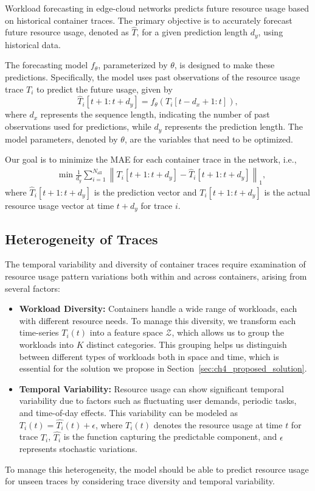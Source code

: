 Workload forecasting in edge-cloud networks predicts future resource usage based on historical container traces. The primary objective is to accurately forecast future resource usage, denoted as $\hat{T}$, for a given prediction length $d_y$, using historical data.

The forecasting model $f_\theta$, parameterized by $\theta$, is designed to make these predictions. Specifically, the model uses past observations of the resource usage trace $T_i$ to predict the future usage, given by
\begin{equation}
    \hat{T}_i[t + 1:t + d_y] = f_\theta\left(T_i[t - d_x + 1:t]\right),
\end{equation}
where $d_x$ represents the sequence length, indicating the number of past observations used for predictions, while $d_y$ represents the prediction length. The model parameters, denoted by $\theta$, are the variables that need to be optimized.

Our goal is to minimize the \ac{MAE} for each container trace in the network, i.e.,
\begin{align}
    &\min \frac{1}{d_y} \sum_{i=1}^{N_{\text{all}}} \left\| T_i[t + 1:t + d_y] - \hat{T}_i[t + 1:t + d_y] \right\|_1,
\end{align}
where $\hat{T}_i[t + 1:t + d_y]$ is the prediction vector and $T_i[t + 1:t + d_y]$ is the actual resource usage vector at time $t + d_y$ for trace $i$.

\subsection{Heterogeneity of Traces}
\label{sec:ch4_container_trace_heterogeneity}

The temporal variability and diversity of container traces require examination of resource usage pattern variations both within and across containers, arising from several factors:

\begin{itemize}
    \item \textbf{Workload Diversity:} Containers handle a wide range of workloads, each with different resource needs. To manage this diversity, we transform each time-series $T_i(t)$ into a feature space $\mathcal{Z}$, which allows us to group the workloads into $K$ distinct categories. This grouping helps us distinguish between different types of workloads both in space and time, which is essential for the solution we propose in Section~\ref{sec:ch4_proposed_solution}.
    
    \item \textbf{Temporal Variability:} Resource usage can show significant temporal variability due to factors such as fluctuating user demands, periodic tasks, and time-of-day effects. This variability can be modeled as $T_i(t) = \hat{T_i}(t) + \epsilon$, where $T_i(t)$ denotes the resource usage at time $t$ for trace $T_i$, $\hat{T_i}$ is the function capturing the predictable component, and $\epsilon$ represents stochastic variations.
\end{itemize}

To manage this heterogeneity, the model should be able to predict resource usage for unseen traces by considering trace diversity and temporal variability.

